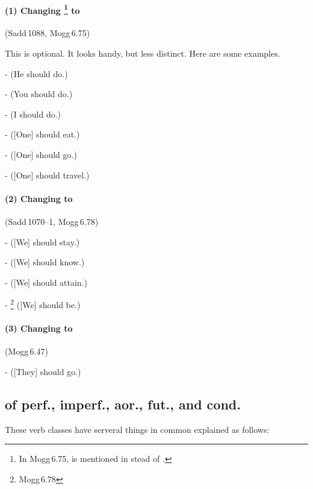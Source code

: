 \paragraph*{(1) Changing \footnote{In Mogg\,6.75,  is mentioned in stead of .} to } (Sadd\,1088, Mogg\,6.75)\par
This is optional. It looks handy, but less distinct. Here are some examples.\par
-  (He should do.)\par
-  (You should do.)\par
-  (I should do.)\par
-  ([One] should eat.)\par
-  ([One] should go.)\par
-  ([One] should travel.)\par

\paragraph*{(2) Changing  to } (Sadd\,1070--1, Mogg\,6.78)\par
-  ([We] should stay.)\par
-  ([We] should know.)\par
-  ([We] should attain.)\par
- \footnote{Mogg\,6.78} ([We] should be.)\par

\paragraph*{(3) Changing  to } (Mogg\,6.47)\par
-  ([They] should go.)\par

\subsection*{ of perf., imperf., aor., fut., and cond.}

These verb classes have serveral things in common explained as follows:

